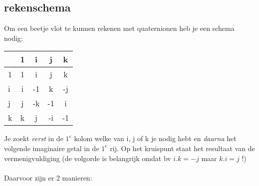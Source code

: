\subsection{rekenschema}
Om een beetje vlot te kunnen rekenen met quaternionen heb je een schema nodig:
\begin{center}
	\begin{tabular}{ | l || c | c |c |c |}
		\hline
		& 1 & i & j & k \\ \hline \hline
		1 & 1 & i & j & k \\ \hline
		i & i & -1 & k & -j\\ \hline
		j & j & -k & -1 & i\\ \hline
		k & k & j & -i & -1\\ 
		\hline 
	\end{tabular}
\end{center}

Je zoekt \textit{eerst} in de $ 1^e $ kolom welke van i, j of k je nodig hebt en \textit{daarna} het volgende  imaginaire getal in de $ 1^e $ rij.  Op het kruispunt staat het resultaat van de vermenigvuldiging (de volgorde is belangrijk omdat bv $  i.k = -j $ maar $ k.i = j  $ !) \\ \\
Daarvoor zijn er 2 manieren:\\

